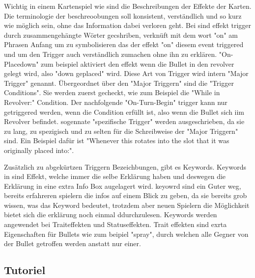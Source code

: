 Wichtig in einem Kartenspiel wie \FF sind die Beschreibungen der Effekte der Karten. Die terminologie der beschreoobungen
soll konsistent, verständlich und so kurz wie möglich sein, ohne das Information dabei verloren geht. Bei \FF sind
effekt trigger durch zusammengehängte Wörter gecshriben, verknüft mit dem wort "on" am Phrasen Anfang um zu symbolisieren
das der effekt "on" diesem event triggered und um den Trigger auch verständlich zumachen ohne ihn zu erklären.
"On-Placedown" zum beispiel aktiviert den effekt wenn die Bullet in den revolver gelegt wird, also "down geplaced" wird.
Diese Art von Trigger wird intern "Major Trigger" genannt.
Übergeordnet über den "Major Triggern" sind die "Trigger Conditions". Sie werden zuerst gecheckt, wie zum Beispiel die "While in Revolver:" Condition.
Der nachfolgende "On-Turn-Begin" trigger kann nur getriggered werden, wenn die Condition erfüllt ist, also wenn die Bullet sich iim Revolver befindet. %
sogennate "spezifische Trigger" werden ausgeschrieben, da sie zu lang, zu spezigisch und zu selten für die Schreibweise der "Major Triggern" sind. Ein Beispiel dafür ist
"Whenever this rotates into the slot that it was originally placed into:".


Zusätzlich zu abgekürtzen Triggern Bezeichbungen, gibt es Keywords. Keywords in \FF sind Effekt, welche immer die selbe
Erklärung haben und deswegen die Erklärung in eine extra Info Box augelagert wird. %
keyowrd sind ein Guter weg, bereits erfahreren spielern die infos auf einem Blick zu geben, da sie bereits grob wissen,
was das Keyword bedeutet, trotzdem aber neuen Spielern die Möglichkeit bietet sich die erklärung noch einmal ddurchzulesen.
Keywords werden angewendet bei Traiteffekten und Statuseffekten. Trait effekten sind exrta Eigenschaften für Bullets wie
zum beipiel "spray", durch welchen alle Gegner von der Bullet getroffen werden anstatt nur einer.





\subsection{Tutoriel}\label{subsec:placementMatters}



